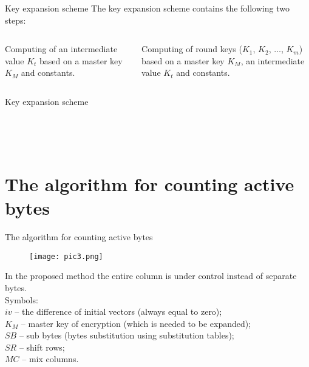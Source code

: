 \documentclass[10pt]{beamer}
\begin{document}
\begin{frame}{Key expansion scheme}
The key expansion scheme contains the following two steps:
\begin{columns}
\begin{column}{0.5\textwidth}
Computing of an intermediate value $K_t$ based on a master key $K_M$ and constants.
\end{column}
\begin{column}{0.5\textwidth}
Computing of round keys ($K_1$, $K_2$, $\dots$, $K_m$) based on a master key $K_M$, an intermediate value $K_t$ and constants.
\end{column}
\end{columns}
\end{frame}

\begin{frame}{Key expansion scheme}
\begin{figure}[h]
\begin{minipage}[h]{0.49\linewidth}
\\
\end{minipage}
\hfill
\begin{minipage}[h]{0.49\linewidth}
\\
\end{minipage}
\end{figure}
\end{frame}

\section{The algorithm for counting active bytes}

\begin{frame}{The algorithm for counting active bytes}
\begin{wrapfigure}{l}{0.6\linewidth}
\texttt{[image: pic3.png]}
\\
\end{wrapfigure}
In the proposed method the entire column is under control instead of separate bytes. \\
Symbols: \\
$iv$ – the difference of initial vectors (always equal to zero); \\
$K_M$ – master key of encryption (which is needed to be expanded); \\
$SB$ – sub bytes (bytes substitution using substitution tables); \\
$SR$ –  shift rows; \\
$MC$ – mix columns.
\end{frame}
\end{document}
